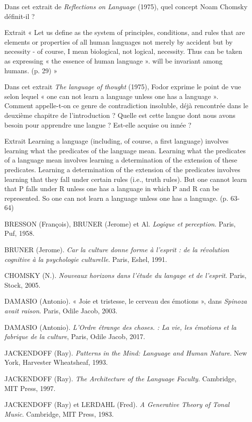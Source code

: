 Dans cet extrait de \emph{Reflections on Language} (1975), quel concept Noam Chomsky définit-il ?
\begin{lecture}{Extrait}
« Let us define \underline{\hspace{2.7cm}} as the system of principles, conditions, and rules that are elements or properties of all human languages not merely by accident but by necessity - of course, I mean biological, not logical, necessity. Thus \underline{\hspace{2.7cm}} can be taken as expressing « the essence of human language ». \underline{\hspace{2.7cm}} will be invariant among humans. (p. 29) »
\end{lecture}
Dans cet extrait \emph{The language of thought} (1975), Fodor exprime le point de vue selon lequel « one can not learn a language unless one has a language ». Comment appelle-t-on ce genre de contradiction insoluble, déjà rencontrée dans le deuxième chapitre de l’introduction ? Quelle est cette langue dont nous avons besoin pour apprendre une langue ? Est-elle acquise ou innée ?
\begin{lecture}{Extrait}
Learning a language (including, of course, a first language) involves learning what the predicates of the language mean. Learning what the predicates of a language mean involves learning a determination of the extension of these predicates. Learning a determination of the extension of the predicates involves learning that they fall under certain rules (i.e., truth rules). But one cannot learn that P falls under R unless one has a language in which P and R can be represented. So one can not learn a language unless one has a language. (p. 63-64)
\end{lecture}

\begingroup\small{}\setlength{\parskip}{.2em}
BRESSON (François), BRUNER (Jerome) et Al. \emph{Logique et perception}. Paris, Puf, 1958.\par
BRUNER (Jerome). \emph{Car la culture donne forme à l’esprit : de la révolution cognitive à la psychologie culturelle}. Paris, Eshel, 1991.\par
CHOMSKY (N.). \emph{Nouveaux horizons dans l’étude du langage et de l’esprit}. Paris, Stock, 2005.\par
DAMASIO (Antonio). « Joie et tristesse, le cerveau des émotions », dans \emph{Spinoza avait raison}. Paris, Odile Jacob, 2003.\par
DAMASIO (Antonio). \emph{L’Ordre étrange des choses. : La vie, les émotions et la fabrique de la culture}, Paris, Odile Jacob, 2017.\par
JACKENDOFF (Ray). \emph{Patterns in the Mind: Language and Human Nature}. New York, Harvester Wheatsheaf, 1993.\par
JACKENDOFF (Ray). \emph{The Architecture of the Language Faculty}. Cambridge, MIT Press, 1997.\par
JACKENDOFF (Ray) et LERDAHL (Fred). \emph{A Generative Theory of Tonal Music}. Cambridge, MIT Press, 1983.\par

